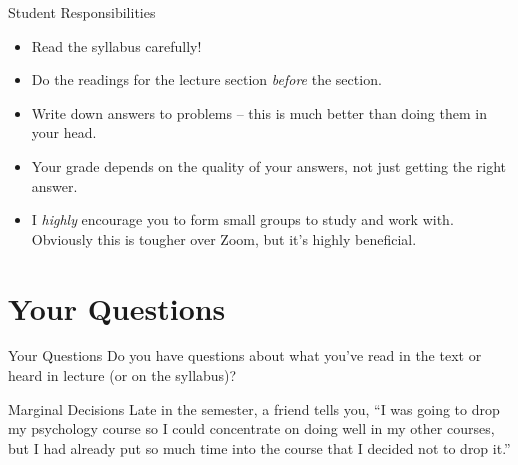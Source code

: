\documentclass{beamer}
\begin{document}
\begin{frame}{Student Responsibilities}
    \begin{itemize}
        \item Read the syllabus carefully!
        \item Do the readings for the lecture section \textit{before} the section.
        \item Write down answers to problems -- this is much better than doing them in your head.
        \item Your grade depends on the quality of your answers, not just getting the right answer.
        \item I \textit{highly} encourage you to form small groups to study and work with. Obviously this is tougher over Zoom, but it's highly beneficial.
    \end{itemize}
\end{frame}

\section{Your Questions}

\begin{frame}{Your Questions}
    Do you have questions about what you've read in the text or heard in lecture (or on the syllabus)?
\end{frame}


\begin{frame}{Marginal Decisions}
    Late in the semester, a friend tells you, “I was going to drop my psychology course so I could concentrate on doing well in my other courses, but I had already put so much time into the course that I decided not to drop it.”
\end{frame}
\end{document}
